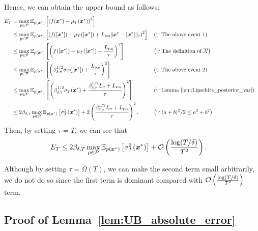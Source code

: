 Hence, we can obtain the upper bound as follows:
\begin{align*}
    E_T &= \max_{p \in {\cal P}} \mathbb{E}_{p(\boldsymbol{x}^*)} \left[ \left( f(\boldsymbol{x}^*) - \mu_T(\boldsymbol{x}^*) \right)^2 \right] \\
    &\leq \max_{p \in {\cal P}} \mathbb{E}_{p(\boldsymbol{x}^*)} \left[ \left( f([\boldsymbol{x}^*]) - \mu_T([\boldsymbol{x}^*]) + L_{\rm res} \| \boldsymbol{x}^* - [\boldsymbol{x}^*] \|_1 \right)^2  \right] 
    && \left(\because \text{The above event~1} \right) \\
    &\leq \max_{p \in {\cal P}} \mathbb{E}_{p(\boldsymbol{x}^*)} \left[ \left( f([\boldsymbol{x}^*]) - \mu_T([\boldsymbol{x}^*]) + \frac{L_{\rm res}}{\tau} \right)^2  \right] 
    && \left(\because \text{The definition of $\overline{{\cal X}}$} \right) \\
    &\leq \max_{p \in {\cal P}} \mathbb{E}_{p(\boldsymbol{x}^*)} \left[ \left( \beta_{\delta, \tau}^{1/2} \sigma_T([\boldsymbol{x}^*]) + \frac{L_{\rm res}}{\tau} \right)^2  \right] 
    && \left(\because \text{The above event~2} \right) \\
    &\leq \max_{p \in {\cal P}} \mathbb{E}_{p(\boldsymbol{x}^*)} \left[ \left( \beta_{\delta, \tau}^{1/2} \sigma_T(\boldsymbol{x}^*) + \frac{\beta_{\delta, \tau}^{1/2} L_{\sigma} + L_{\rm res}}{\tau} \right)^2  \right] 
    && \left(\because \text{Lemma~\ref{lem:Lipschitz_posterior_var}} \right) \\
    &\leq 2 \beta_{\delta, \tau} \max_{p \in {\cal P}} \mathbb{E}_{p(\boldsymbol{x}^*)} \left[  \sigma_T^2(\boldsymbol{x}^*) \right] + 2 \left( \frac{\beta_{\delta, \tau}^{1/2} L_{\sigma} + L_{\rm res}}{\tau} \right)^2.
    && \left(\because (a + b)^2 / 2 \leq a^2 + b^2 \right)
\end{align*}
%
Then, by setting $\tau = T$, we can see that
\begin{align*}
    E_T 
    &\leq 2 \beta_{\delta, T} \max_{p \in {\cal P}} \mathbb{E}_{p(\boldsymbol{x}^*)} \left[  \sigma_T^2(\boldsymbol{x}^*) \right] 
    + {\cal O}\left( \frac{\log(T / \delta)}{T^2} \right).
\end{align*}


Although by setting $\tau = \Omega(T)$, we can make the second term small arbitrarily, we do not do so since the first term is dominant compared with ${\cal O}\left( \frac{\log(T / \delta)}{T^2} \right)$ term.


\subsection{Proof of Lemma~\ref{lem:UB_absolute_error}}
\label{sec:UB_absolute_error_proof}


